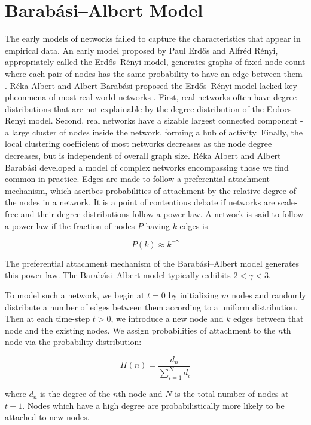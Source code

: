 \chapter{Barabási–Albert Model}
\label{section:BA model}
The early models of networks failed to capture the characteristics that appear in empirical data. An
 early model proposed by Paul Erdős and Alfréd Rényi, appropriately called the Erdős–Rényi model, generates
graphs of fixed node count where each pair of nodes has the same probability to have an edge between them \cite{Erdoes}. 
Réka Albert and Albert Barabási proposed the Erdős–Rényi model 
lacked key pheonmena of most real-world networks \cite{barabasi2016network}.
 First, real networks often have degree distributions 
that are not explainable by the degree distribution of the Erdoes-Renyi model.
Second, real networks have a sizable largest connected component - a large cluster 
of nodes inside the network, forming a hub of activity.
 Finally, the local clustering coefficient of most networks
decreases as the node degree decreases, but is independent of overall graph size.
Réka Albert and Albert Barabási developed a model of complex networks 
encompassing those we find common in practice.
Edges are made to follow a preferential attachment
mechanism, which ascribes probabilities of attachment by the relative degree of the nodes in a network. 
It is a point of contentious debate if networks are scale-free and their degree distributions follow a power-law.
A network is said to follow a power-law if the fraction of nodes $P$ having $k$ edges is 

$$
P(k) \approx k^{-\gamma} 
$$

\noindent The preferential attachment mechanism of the Barabási–Albert model generates this power-law. 
The Barabási–Albert model typically exhibits $2<\gamma<3$.

To model such a network, we begin at $t=0$ by initializing $m$ nodes and randomly distribute a number of edges between them
according to a uniform distribution. Then at each time-step $t > 0$, we introduce a new node 
and $k$ edges between that node and the existing nodes. We assign probabilities of attachment to the $n$th node via the
 probability distribution:

$$
\Pi(n) = \frac{d_n}{\sum^{N}_{i=1} d_i}
$$

\noindent where $d_n$ is the degree of the $n$th node and $N$ is the total number of nodes at $t-1$.
 Nodes which have a high degree are probabilistically more likely to be attached to new nodes. 

